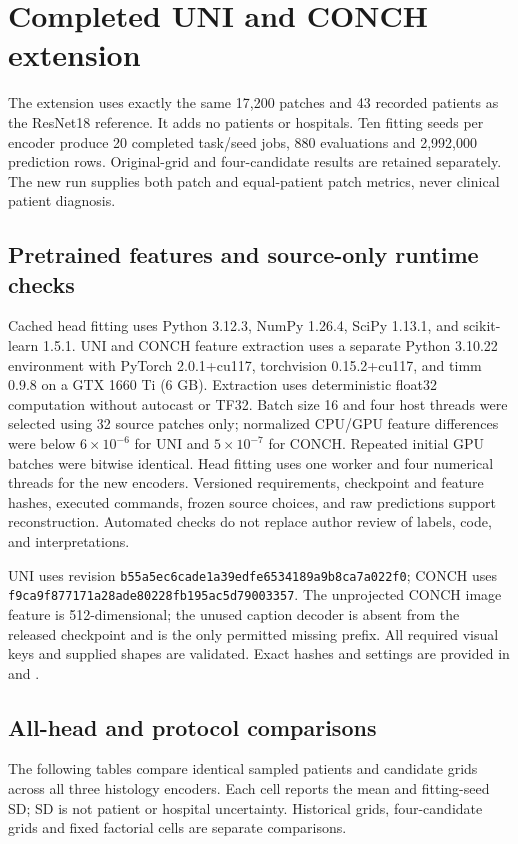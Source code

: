 \documentclass[10pt,letterpaper]{article}
\begin{document}
\section{Completed UNI and CONCH extension}
The extension uses exactly the same 17,200 patches and 43 recorded patients as the ResNet18 reference. It adds no patients or hospitals. Ten fitting seeds per encoder produce 20 completed task/seed jobs, 880 evaluations and 2,992,000 prediction rows. Original-grid and four-candidate results are retained separately. The new run supplies both patch and equal-patient patch metrics, never clinical patient diagnosis.

\subsection{Pretrained features and source-only runtime checks}
Cached head fitting uses Python 3.12.3, NumPy 1.26.4, SciPy 1.13.1, and scikit-learn 1.5.1. UNI and CONCH feature extraction uses a separate Python 3.10.22 environment with PyTorch 2.0.1+cu117, torchvision 0.15.2+cu117, and timm 0.9.8 on a GTX 1660 Ti (6 GB). Extraction uses deterministic float32 computation without autocast or TF32. Batch size 16 and four host threads were selected using 32 source patches only; normalized CPU/GPU feature differences were below $6\times10^{-6}$ for UNI and $5\times10^{-7}$ for CONCH. Repeated initial GPU batches were bitwise identical. Head fitting uses one worker and four numerical threads for the new encoders. Versioned requirements, checkpoint and feature hashes, executed commands, frozen source choices, and raw predictions support reconstruction. Automated checks do not replace author review of labels, code, and interpretations.

UNI uses revision \texttt{b55a5ec6cade1a39edfe6534189a9b8ca7a022f0}; CONCH uses \texttt{f9ca9f877171a28ade80228fb195ac5d79003357}. The unprojected CONCH image feature is 512-dimensional; the unused caption decoder is absent from the released checkpoint and is the only permitted missing prefix. All required visual keys and supplied shapes are validated. Exact hashes and settings are provided in  and .

\subsection{All-head and protocol comparisons}
The following tables compare identical sampled patients and candidate grids across all three histology encoders. Each cell reports the mean and fitting-seed SD; SD is not patient or hospital uncertainty. Historical grids, four-candidate grids and fixed factorial cells are separate comparisons.
\end{document}
